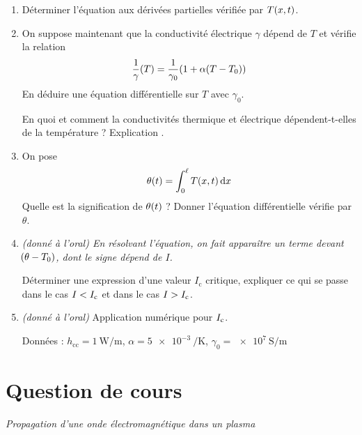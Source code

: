 \documentclass[a4paper,french,bookmarks]{article}
\begin{document}
    \begin{enumerate}
        \item Déterminer l'équation aux dérivées partielles vérifiée par $T\!\left(x, t\right)$.\medskip

        \item On suppose maintenant que la conductivité électrique $\gamma$ dépend de $T$ et vérifie la relation
        \[ \dfrac{1}{\gamma}\!\left(T\right) = \dfrac{1}{\gamma_0}\!\left(1 + \alpha\!\left(T - T_0\right)\right)\]
        En déduire une équation différentielle sur $T$ avec $\gamma_0$.\medskip

        En quoi et comment la conductivités thermique et électrique dépendent-t-elles de la température ? Explication .\medskip

        \item On pose 
        \[ \theta\!\left(t\right) = \int_0^\ell T\!\left(x, t\right)\mathrm d x\]
        Quelle est la signification de $\theta\!\left(t\right)$ ? Donner l'équation différentielle vérifie par $\theta$.\medskip

        \item \emph{(donné à l'oral) En résolvant l'équation, on fait apparaître un terme devant $\!\left(\theta - T_0\right)$, dont le signe dépend de $I$.}
        
        Déterminer une expression d'une valeur $I_\text{c}$ critique, expliquer ce qui se passe dans le cas $I < I_\text c$ et dans le cas $I > I_\text c$.\medskip

        

        \item \emph{(donné à l'oral)} Application numérique pour $I_\text c$.

        Données : $h_\text{cc} = \qty{1}{\watt\per\meter}$, $\alpha = \qty{5e-3}{\per\kelvin}$, $\gamma_0 = \qty{e7}{\siemens\per\meter}$
    \end{enumerate}

    \section{Question de cours}

    \begin{center}
        \emph{Propagation d'une onde électromagnétique dans un plasma}
    \end{center}
\end{document}
